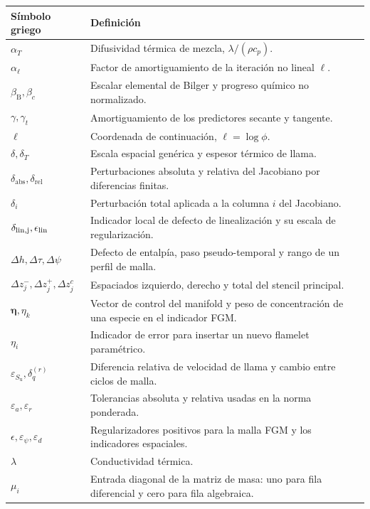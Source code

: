 \documentclass[12pt,a4paper,twoside,openany]{book}
\newcommand{\Su}{S_{\mathrm{u}}}
\begin{document}
\begin{longtable}{@{}p{}p{}@{}}
\toprule
\textbf{Símbolo griego} & \textbf{Definición} \\
\midrule
\endhead
\(\alpha_T\) & Difusividad térmica de mezcla, \(\lambda/(\rho c_p)\). \\
\(\alpha_\ell\) & Factor de amortiguamiento de la iteración no lineal \(\ell\). \\
\(\beta_{\mathrm B},\beta_c\) & Escalar elemental de Bilger y progreso químico no normalizado. \\
\(\gamma,\gamma_t\) & Amortiguamiento de los predictores secante y tangente.
\\
\(\ell\) & Coordenada de continuación, \(\ell=\log\phi\). \\
\(\delta,\delta_T\) & Escala espacial genérica y espesor térmico de llama. \\
\(\delta_{\mathrm{abs}},\delta_{\mathrm{rel}}\) & Perturbaciones absoluta y relativa del Jacobiano por diferencias finitas. \\
\(\delta_i\) & Perturbación total aplicada a la columna \(i\) del Jacobiano. \\
\(\delta_{\rm lin,j},\epsilon_{\rm lin}\) & Indicador local de defecto de linealización y su escala de regularización. \\
\(\Delta h,\Delta\tau,\Delta\psi\) & Defecto de entalpía, paso pseudo-temporal y rango de un perfil de malla. \\
\(\Delta z_j^-,\Delta z_j^+,\Delta z_j^c\) & Espaciados izquierdo, derecho y total del stencil principal. \\
\(\boldsymbol\eta,\eta_k\) & Vector de control del manifold y peso de concentración de una especie en el indicador FGM. \\
\(\eta_i\) & Indicador de error para insertar un nuevo flamelet paramétrico. \\
\(\varepsilon_{\Su},\delta_q^{(r)}\) & Diferencia relativa de velocidad de llama y cambio entre ciclos de malla. \\
\(\varepsilon_a,\varepsilon_r\) & Tolerancias absoluta y relativa usadas en la norma ponderada. \\
\(\epsilon,\varepsilon_\psi,\varepsilon_d\) & Regularizadores positivos para la malla FGM y los indicadores espaciales. \\
\(\lambda\) & Conductividad térmica. \\
\(\mu_i\) & Entrada diagonal de la matriz de masa: uno para fila diferencial y cero para fila algebraica. \\

\end{longtable}
\end{document}
